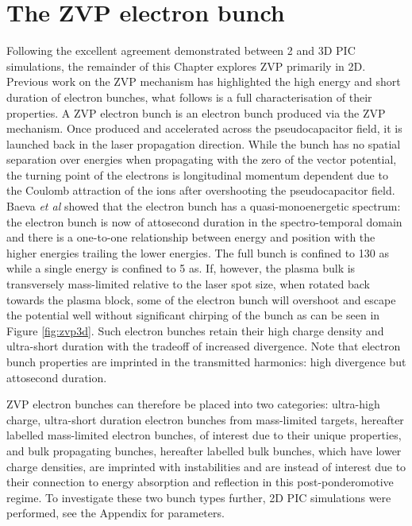 \section{The ZVP electron bunch}\label{sec:zvp-bunches}
Following the excellent agreement demonstrated between 2 and 3D PIC simulations, the remainder of this Chapter explores ZVP primarily in 2D. Previous work on the ZVP mechanism has highlighted the high energy and short duration of electron bunches, what follows is a full characterisation of their properties. A ZVP electron bunch is an electron bunch produced via the ZVP mechanism. Once produced and accelerated across the pseudocapacitor field, it is launched back in the laser propagation direction. While the bunch has no spatial separation over energies when propagating with the zero of the vector potential, the turning point of the electrons is longitudinal momentum dependent due to the Coulomb attraction of the ions after overshooting the pseudocapacitor field. Baeva \textit{et al} showed that the electron bunch has a quasi-monoenergetic spectrum: the electron bunch is now of attosecond duration in the spectro-temporal domain and there is a one-to-one relationship between energy and position with the higher energies trailing the lower energies. The full bunch is confined to 130 as while a single energy is confined to 5 as. If, however, the plasma bulk is transversely mass-limited relative to the laser spot size, when rotated back towards the plasma block, some of the electron bunch will overshoot and escape the potential well without significant chirping of the bunch as can be seen in Figure \ref{fig:zvp3d}. Such electron bunches retain their high charge density and ultra-short duration with the tradeoff of increased divergence. Note that electron bunch properties are imprinted in the transmitted harmonics: high divergence but attosecond duration.

ZVP electron bunches can therefore be placed into two categories: ultra-high charge, ultra-short duration electron bunches from mass-limited targets, hereafter labelled mass-limited electron bunches, of interest due to their unique properties, and bulk propagating bunches, hereafter labelled bulk bunches, which have lower charge densities, are imprinted with instabilities and are instead of interest due to their connection to energy absorption and reflection in this post-ponderomotive regime. To investigate these two bunch types further, 2D PIC simulations were performed, see the Appendix for parameters.

